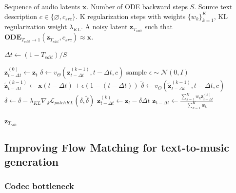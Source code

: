 
\begin{algorithm}
\caption{Proposed regularized FM inversion}\label{alg:cap}
\begin{algorithmic}
\Require Sequence of audio latents $\mathbf{x}$. Number of ODE backward steps $S$. Source text description $c\in\{\varnothing,c_{src}\}$. K regularization steps with weights $\{w_k\}_{k=1}^{K}$, KL regularization weight $\lambda_{KL}$. 
\Ensure A noisy latent $\mathbf{z}_{T_{edit}}$ such that $\textbf{ODE}_{T_{edit}\xrightarrow{}1}(\mathbf{z}_{T_{edit}},c_{src})\approx\mathbf{x}$.

\State $\Delta{t} \gets (1 - T_{edit})/{S}$

\State $\mathbf{z}^{(0)}_{t-\Delta{t}} \gets \mathbf{z}_{t}$
\State $\delta \gets v_{\Theta}(\mathbf{z}^{(k-1)}_{t-\Delta{t}}, t-\Delta{t}, c)$
\State sample $\epsilon \sim \mathcal{N}(0, I)$
\State $\mathbf{\tilde{z}}^{(k-1)}_{t-\Delta{t}} \gets \mathbf{x}(t-\Delta{t}) + \epsilon(1-(t-\Delta{t}))$
\State $\tilde{\delta} \gets v_{\Theta}(\mathbf{\tilde{z}}^{(k-1)}_{t-\Delta{t}}, t-\Delta{t}, c)$
\State $\delta \gets \delta - \lambda_{KL}\nabla_\delta\mathcal{L}_{patchKL}(\delta, \tilde{\delta})$
\EndIf
\State $\mathbf{z}^{(k)}_{t-\Delta{t}} \gets \mathbf{z}_{t} - \delta\Delta{t}$
\EndFor
\State $\mathbf{z}_{t-\Delta{t}} \gets \frac{\sum_{k=1}^{K} w_k \mathbf{z}^{(k)}_{t-\Delta{t}}}{\sum_{k=1}^{K} w_k}$
\EndFor

\State \Return $\mathbf{z}_{T_{edit}}$

\end{algorithmic}
\end{algorithm}

\subsection{Improving Flow Matching for text-to-music generation}

\subsubsection{Codec bottleneck}

